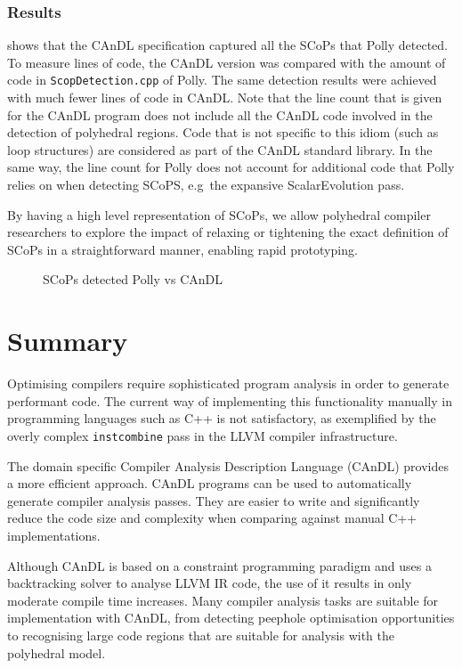\subsubsection{Results}

     shows that the CAnDL specification captured all the
    SCoPs that Polly detected.
    To measure lines of code, the CAnDL version was compared with the amount of
    code in \texttt{ScopDetection.cpp} of Polly.
    The same detection results were achieved with much fewer lines of code in
    CAnDL.
    Note that the line count that is given for the CAnDL program does not
    include all the CAnDL code involved in the detection of polyhedral regions.
    Code that is not specific to this idiom (such as loop structures) are
    considered as part of the CAnDL standard library.
    In the same way, the line count for Polly does not account for additional
    code that Polly relies on when detecting SCoPS, e.g\ the expansive
    ScalarEvolution pass.

    By having a high level representation of SCoPs, we allow polyhedral compiler
    researchers to explore the impact of relaxing or tightening the exact
    definition of SCoPs in a straightforward manner, enabling rapid prototyping.

\begin{figure}[ht]
    
    \caption{SCoPs detected Polly vs CAnDL}
    \label{fig:candlvspolly}
\end{figure}

\pagebreak

\section{Summary}

    Optimising compilers require sophisticated program analysis in order to
    generate performant code.
    The current way of implementing this functionality manually in programming
    languages such as C++ is not satisfactory, as exemplified by the overly
    complex {\tt instcombine} pass in the LLVM compiler infrastructure.

    The domain specific Compiler Analysis Description Language (CAnDL) provides
    a more efficient approach.
    CAnDL programs can be used to automatically generate compiler analysis
    passes.
    They are easier to write and significantly reduce the code size and
    complexity when comparing against manual C++ implementations.

    Although CAnDL is based on a constraint programming paradigm and uses a
    backtracking solver to analyse LLVM IR code, the use of it results in
    only moderate compile time increases.
    Many compiler analysis tasks are suitable for implementation with CAnDL,
    from detecting peephole optimisation opportunities to recognising large
    code regions that are suitable for analysis with the polyhedral model.
